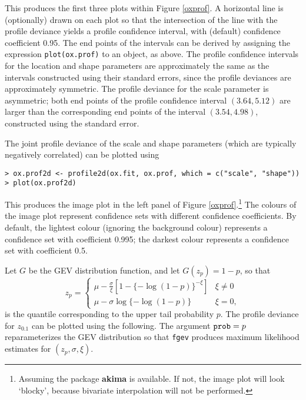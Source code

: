 \documentclass[11pt,a4paper]{article}
\begin{document}
This produces the first three plots within Figure \ref{oxprof}. A horizontal line is (optionally) drawn on each plot so that the intersection of the line with the profile deviance yields a profile confidence interval, with (default) confidence coefficient 0.95.
The end points of the intervals can be derived by assigning the expression \verb+plot(ox.prof)+ to an object, as above.
The profile confidence intervals for the location and shape parameters are approximately the same as the intervals constructed using their standard errors, since the profile deviances are approximately symmetric.
The profile deviance for the scale parameter is asymmetric; both end points of the profile confidence interval $(3.64, 5.12)$ are larger than the corresponding end points of the interval $(3.54, 4.98)$, constructed using the standard error.

The joint profile deviance of the scale and shape parameters (which are typically negatively correlated) can be plotted using

\begin{verbatim}
> ox.prof2d <- profile2d(ox.fit, ox.prof, which = c("scale", "shape"))
> plot(ox.prof2d)
\end{verbatim}

This produces the image plot in the left panel of Figure \ref{oxprof}.\footnote{Assuming the package \textbf{akima} is available. If not, the image plot will look `blocky', because bivariate interpolation will not be performed.}  
The colours of the image plot represent confidence sets with different confidence coefficients.
By default, the lightest colour (ignoring the background colour) represents a confidence set with coefficient 0.995; the darkest colour represents a confidence set with coefficient 0.5.

Let $G$ be the GEV distribution function, and let $G(z_p) = 1-p$, so that
\begin{equation}
z_p = 
\begin{cases}
\mu - \frac{\sigma}{\xi}[1 - \{-\log(1-p)\}^{-\xi}] & \xi \neq 0 \\
\mu - \sigma \log\{-\log(1-p)\} & \xi = 0,
\end{cases}
\end{equation}
is the quantile corresponding to the upper tail probability $p$.
The profile deviance for $z_{0.1}$ can be plotted using the following.
The argument $\verb+prob+ = p$ reparameterizes the GEV distribution so that \verb+fgev+ produces maximum likelihood estimates for $(z_p,\sigma,\xi)$. 
 
\end{document}
